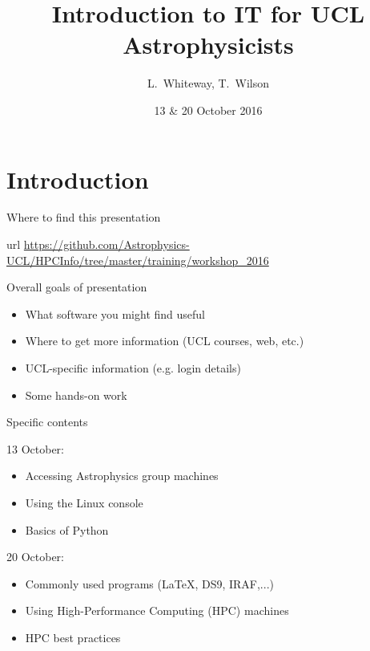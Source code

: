 \documentclass{beamer}
\title[IT Workshops] %
{Introduction to IT for UCL Astrophysicists}
\author[Whiteway, Wilson] %
{L.~Whiteway, T.~Wilson}
\institute[UCL]
{
  Department of Physics and Astronomy\\
  University College London
}
\date[IT 2016]
{13 \& 20 October 2016}
\begin{document}
\frame{\titlepage}

\section{Introduction}

\begin{frame}{Where to find this presentation}
  \begin{block}{url}
    \url{https://github.com/Astrophysics-UCL/HPCInfo/tree/master/training/workshop_2016}
  \end{block}
\end{frame}


\begin{frame}{Overall goals of presentation}
  \begin{itemize}
    \item What software you might find useful
    \item Where to get more information (UCL courses, web, etc.)
    \item UCL-specific information (e.g. login details)
    \item Some hands-on work
  \end{itemize}
\end{frame}

\begin{frame}{Specific contents}

  \begin{block}{13 October:}
    \begin{itemize}
      \item Accessing Astrophysics group machines
      \item Using the Linux console
      \item Basics of Python
    \end{itemize}
  \end{block}
  
  \begin{block}{20 October:}
    \begin{itemize}
    \item Commonly used programs (LaTeX, DS9, IRAF,...)
    \item Using High-Performance Computing (HPC) machines
    \item HPC best practices
    \end{itemize}
  \end{block}

\end{frame}
\end{document}
